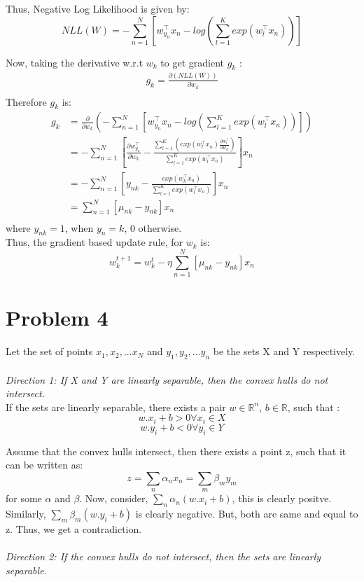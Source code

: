 \documentclass{article}
\begin{document}
Thus, Negative Log Likelihood is given by:
$$NLL(W) =  -\sum_{n=1}^N [w_{y_n}^\top x_n - log(\sum_{l=1}^K exp(w_l^\top x_n))]  $$

Now, taking the derivative w.r.t $w_k$ to get gradient $g_k$ :
\begin{equation*}
\begin{aligned}
g_k = \frac{\partial(NLL(W))}{\partial w_k} \\
\end{aligned}
\end{equation*}
Therefore $g_k$ is:
\begin{equation*}
\begin{aligned}
g_k &= \frac{\partial}{\partial w_k}(-\sum_{n=1}^N [w_{y_n}^\top x_n - log(\sum_{l=1}^K exp(w_l^\top x_n))]) \\ 
&= - \sum_{n=1}^N [\frac{\partial w_{y_n}^\top}{\partial w_k} - \frac{\sum_{l=1}^K (exp(w_l^\top x_n)\frac{\partial w_l^\top }{\partial w_k})}{\sum_{l=1}^K exp(w_l^\top x_n)}]x_n \\
&= - \sum_{n=1}^N [y_{nk} - \frac{exp(w_k^\top x_n)}{\sum_{l=1}^K exp(w_l^\top x_n)}]x_n \\
&= \sum_{n=1}^N [\mu_{nk} - y_{nk} ]x_n \\
\end{aligned}
\end{equation*}
where $y_{nk}=1$, when $y_n = k$, 0 otherwise. \\
Thus, the gradient based update rule, for $w_k$ is:
$$w_k^{t+1} = w_k^{t} - \eta \sum_{n=1}^N [\mu_{nk} - y_{nk} ]x_n$$
\section{Problem 4}

Let the set of points ${x_1,x_2,...x_N}$ and ${y_1,y_2,...y_n}$ be the sets X and Y respectively.\\ \\
\emph{Direction 1: If X and Y are linearly separable, then the convex hulls do not intersect.} \\

If the sets are linearly separable, there exists a pair $w \in \mathds{R}^n$, $b \in \mathds{R}$, such that :
$$w.x_i + b > 0 \forall x_i \in X$$
$$w.y_i + b < 0 \forall y_i \in Y$$

Assume that the convex hulls intersect, then there exists a point z, such that it can be written as:
$$z = \sum_n \alpha_n x_n = \sum_m \beta_m y_m$$
for some $\alpha$ and $\beta$. Now, consider, $\sum_n \alpha_n(w.x_i + b)$, this is clearly positve. Similarly, $\sum_m \beta_m(w.y_i + b)$ is clearly negative. But, both are same and equal to z. Thus, we get a contradiction.\\ \\
\emph{Direction 2: If the convex hulls do not intersect, then the sets are linearly separable.} \\
\end{document}
